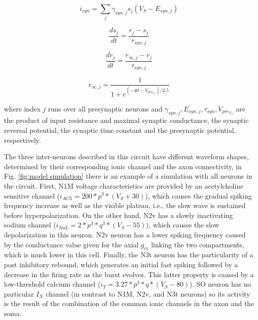 \begin{equation}
	i_{syn} = \sum_j \gamma_{syn,j} s_j (V_S - E_{syn,j})
	\label{eq:syn1}
\end{equation}

\begin{equation}
	\frac{ds_j}{dt} = \frac{r_{j}-s_j}{\tau_{syn,j}}
\end{equation}

\begin{equation}
	\frac{dr_j}{dt} = \frac{r_{\infty,j}-r_j}{\tau_{syn,j}}
\end{equation}

\begin{equation}
	r_{\infty,j}=\frac{1}{1+e^{(-40-V_{pre_{V_S}})/2.5}}
	\label{eq:syn2}
\end{equation}


\noindent where index $j$ runs over all presynaptic neurons and \(\gamma_{syn,j}, E_{syn,j},\tau_{syn},V_{pre_{V_S}}\) are the product of input resistance and maximal synaptic conductance, the synaptic reversal potential, the synaptic time constant and the presynaptic potential, respectively. 

The three inter-neurons described in this circuit have different waveform shapes, determined by their corresponding ionic channel and the axon connectivity, in Fig. \ref{fig:model simulation} there is an example of a simulation with all neurons in the circuit. First, N1M voltage characteristics are provided by an acetylcholine sensitive channel (\(i_{ACh} = 200 * p^3 * (V_S + 30)\)), which causes the gradual spiking frequency increase as well as the visible plateau, i.e., the slow wave is sustained before hyperpolarization. On the other hand, N2v has a slowly inactivating sodium channel (\(i_{NaL} = 2 * p^3 * q^3 * (V_S-55)\)), which causes the slow depolarization in this neuron. N2v neuron has a lower spiking frequency caused by the conductance value given for the axial $g_{ec}$ linking the two compartments, which is much lower in this cell. Finally, the N3t neuron has the particularity of a post inhibitory rebound, which generates an initial fast spiking followed by a decrease in the firing rate as the burst evolves. This latter property is caused by a low-threshold calcium channel (\( i_T = 3.27 * p^3 * q *(V_S-80)\)). SO neuron has no particular  \(I_X\) channel (in contrast to N1M, N2v, and N3t neurons) so its activity is the result of the combination of the common ionic channels in the axon and the soma.


